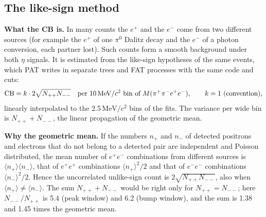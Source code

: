 \documentclass[11pt,a4paper]{article}
\newcommand{\piz}{\ensuremath{\pi^{0}}\xspace}
\newcommand{\Mfour}{\ensuremath{M(\pi^{+}\pi^{-}e^{+}e^{-})}\xspace}
\newcommand{\MeVcc}{\ensuremath{\mathrm{MeV}/c^{2}}\xspace}
\begin{document}
\subsection{The like-sign method}
\label{sec:cbmethod}
\textbf{What the CB is.} In many counts the $e^+$ and the $e^-$ come from two different sources (for example the
$e^+$ of one \piz Dalitz decay and the $e^-$ of a photon conversion, each partner lost). Such counts form a smooth
background under both $\eta$ signals. It is estimated from the like-sign hypotheses of the same events, which PAT
writes in separate trees and FAT processes with the same code and cuts:
\begin{equation}
\mathrm{CB} = k\cdot 2\sqrt{N_{++}N_{--}}\quad\text{per 10\,\MeVcc bin of \Mfour},\qquad k=1\ \text{(convention)},
\label{eq:cb}
\end{equation}
linearly interpolated to the 2.5\,\MeVcc bins of the fits. The variance per wide bin is $N_{++}+N_{--}$, the
linear propagation of the geometric mean.

\textbf{Why the geometric mean.} If the numbers $n_+$ and $n_-$ of detected positrons and electrons that do not
belong to a detected pair are independent and Poisson distributed, the mean number of $e^+e^-$ combinations
from different sources is $\langle n_+\rangle\langle n_-\rangle$, that of $e^+e^+$ combinations
$\langle n_+\rangle^2/2$ and that of $e^-e^-$ combinations $\langle n_-\rangle^2/2$. Hence the uncorrelated
unlike-sign count is $2\sqrt{N_{++}N_{--}}$, also when $\langle n_+\rangle\ne\langle n_-\rangle$. The sum
$N_{++}+N_{--}$ would be right only for $N_{++}=N_{--}$; here $N_{--}/N_{++}$ is 5.4 (peak window) and 6.2 (bump window),
and the sum is 1.38 and 1.45 times the geometric mean.
\end{document}
